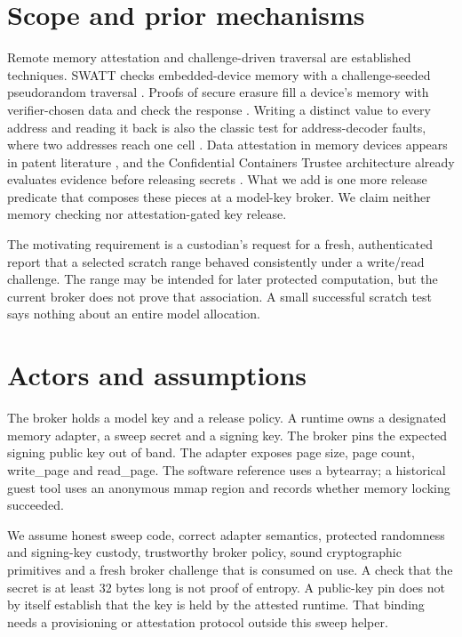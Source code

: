 \documentclass[10pt,letterpaper]{article}
\let\plainsection\section
\renewcommand{\section}{\Needspace{6\baselineskip}\plainsection}
\begin{document}
\section{Scope and prior mechanisms}

Remote memory attestation and challenge-driven traversal are established techniques. SWATT checks embedded-device memory with a challenge-seeded pseudorandom traversal \cite{ref1}. Proofs of secure erasure fill a device's memory with verifier-chosen data and check the response \cite{ref6}. Writing a distinct value to every address and reading it back is also the classic test for address-decoder faults, where two addresses reach one cell \cite{ref7}. Data attestation in memory devices appears in patent literature \cite{ref2}, and the Confidential Containers Trustee architecture already evaluates evidence before releasing secrets \cite{ref3}. What we add is one more release predicate that composes these pieces at a model-key broker. We claim neither memory checking nor attestation-gated key release.


The motivating requirement is a custodian's request for a fresh, authenticated report that a selected scratch range behaved consistently under a write/read challenge. The range may be intended for later protected computation, but the current broker does not prove that association. A small successful scratch test says nothing about an entire model allocation.


\section{Actors and assumptions}

The broker holds a model key and a release policy. A runtime owns a designated memory adapter, a sweep secret and a signing key. The broker pins the expected signing public key out of band. The adapter exposes page size, page count, write\_page and read\_page. The software reference uses a bytearray; a historical guest tool uses an anonymous mmap region and records whether memory locking succeeded.


We assume honest sweep code, correct adapter semantics, protected randomness and signing-key custody, trustworthy broker policy, sound cryptographic primitives and a fresh broker challenge that is consumed on use. A check that the secret is at least 32 bytes long is not proof of entropy. A public-key pin does not by itself establish that the key is held by the attested runtime. That binding needs a provisioning or attestation protocol outside this sweep helper.
\end{document}
